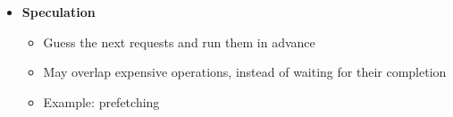 \begin{itemize}
\item \textbf{Speculation}
  \begin{itemize}
  \item Guess the next requests and run them in advance
  \item May overlap expensive operations, instead of
    waiting for their completion
  \item Example: prefetching
  \end{itemize}
\end{itemize}

